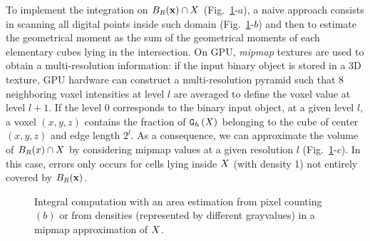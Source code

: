 \documentclass{llncs}
\begin{document}
To implement the integration on $B_R(\mathbf{x})\cap X$
(Fig.~\ref{fig:approx}-$a$), a naive approach consists in scanning all
digital points inside such domain (Fig.~\ref{fig:approx}-$b$) and then
to estimate the geometrical moment as the sum of the geometrical
moments of each elementary cubes lying in the intersection. On GPU,
\emph{mipmap} textures are used to obtain a multi-resolution information: if the
input binary object is stored in a 3D texture, GPU hardware can
construct a multi-resolution pyramid such that 8 neighboring voxel
intensities at level $l$ are averaged to define the voxel value at
level $l+1$. If the level 0 corresponds to the binary input object, at
a given level $l$, a voxel $(x,y,z)$ contains the fraction of $\mathtt{G}_{h}\left(X\right)$
belonging to the cube of center $(x,y,z)$ and edge length $2^l$. As a
consequence, we can approximate the volume of $B_R(x)\cap X$ by
considering mipmap values at a given resolution $l$
(Fig.~\ref{fig:approx}-$c$). In this case, errors only occurs for
cells lying inside $X$ (with density 1) not entirely covered by
$B_R(\mathbf{x})$.
\begin{figure}
  \begin{center}
  \end{center}
  \caption{Integral computation with an area estimation from pixel
    counting $(b)$ or from densities (represented by different
    grayvalues) in a mipmap approximation of $X$.}
  \label{fig:approx}
\end{figure}
\end{document}
